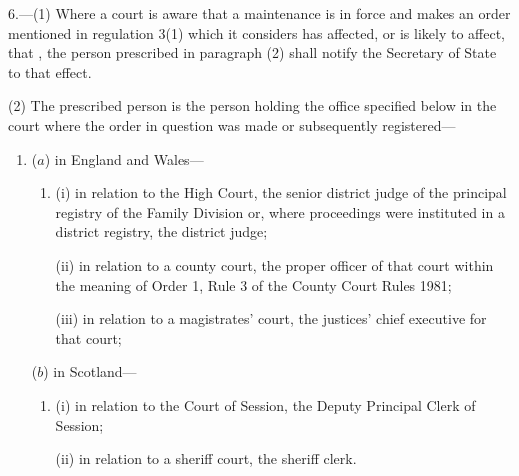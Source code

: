 \documentclass[12pt,a4paper]{article}
\begin{document}
6.—(1) Where a court is aware that a maintenance  is in force and makes an order mentioned in regulation 3(1) which it considers has affected, or is likely to affect, that , the person prescribed in paragraph (2) shall notify the Secretary of State to that effect.

(2) The prescribed person is the person holding the office specified below in the court where the order in question was made or subsequently registered—
\begin{enumerate}\item[]
($a$) in England and Wales—
\begin{enumerate}\item[]
(i) in relation to the High Court, the senior district judge of the principal registry of the Family Division or, where proceedings were instituted in a district registry, the district judge;

(ii) in relation to a county court, the proper officer of that court within the meaning of Order 1, Rule 3 of the County Court Rules 1981;

(iii) in relation to a magistrates' court, the 
justices' chief executive for  %
that court;
\end{enumerate}

($b$) in Scotland—
\begin{enumerate}\item[]
(i) in relation to the Court of Session, the Deputy Principal Clerk of Session;

(ii) in relation to a sheriff court, the sheriff clerk.
\end{enumerate}
\end{enumerate}

\end{document}
